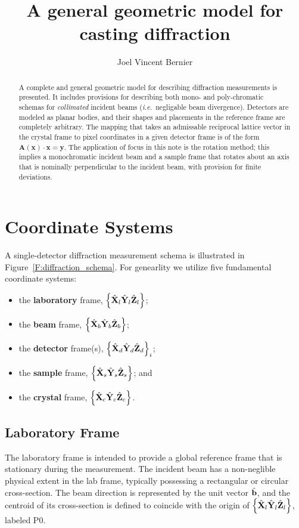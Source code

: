 \documentclass[12pt,letterpaper,final]{amsart}
\author{Joel Vincent Bernier}
\title{A general geometric model for casting diffraction}
\newcommand{\mbm}[1]{\ensuremath{\mbox{\boldmath$#1$}}}
\newcommand{\bhat}{\ensuremath{\hat{\mbm{\mathrm{b}}}}}
\newcommand{\Pzero}{\ensuremath{\mathrm{P0}}}
\newcommand{\Xl}{\ensuremath{\hat{\mbm{\mathrm{X}}}_l}}
\newcommand{\Yl}{\ensuremath{\hat{\mbm{\mathrm{Y}}}_l}}
\newcommand{\Zl}{\ensuremath{\hat{\mbm{\mathrm{Z}}}_l}}
\newcommand{\labframe}{\ensuremath{\left\{\Xl\Yl\Zl\right\}}}
\newcommand{\Xb}{\ensuremath{\hat{\mbm{\mathrm{X}}}_b}}
\newcommand{\Yb}{\ensuremath{\hat{\mbm{\mathrm{Y}}}_b}}
\newcommand{\Zb}{\ensuremath{\hat{\mbm{\mathrm{Z}}}_b}}
\newcommand{\beamframe}{\ensuremath{\left\{\Xb\Yb\Zb\right\}}}
\newcommand{\Xd}{\ensuremath{\hat{\mbm{\mathrm{X}}}_d}}
\newcommand{\Yd}{\ensuremath{\hat{\mbm{\mathrm{Y}}}_d}}
\newcommand{\Zd}{\ensuremath{\hat{\mbm{\mathrm{Z}}}_d}}
\newcommand{\detframe}{\ensuremath{\left\{\Xd\Yd\Zd\right\}}}
\newcommand{\Xs}{\ensuremath{\hat{\mbm{\mathrm{X}}}_s}}
\newcommand{\Ys}{\ensuremath{\hat{\mbm{\mathrm{Y}}}_s}}
\newcommand{\Zs}{\ensuremath{\hat{\mbm{\mathrm{Z}}}_s}}
\newcommand{\samframe}{\ensuremath{\left\{\Xs\Ys\Zs\right\}}}
\newcommand{\Xc}{\ensuremath{\hat{\mbm{\mathrm{X}}}_c}}
\newcommand{\Yc}{\ensuremath{\hat{\mbm{\mathrm{Y}}}_c}}
\newcommand{\Zc}{\ensuremath{\hat{\mbm{\mathrm{Z}}}_c}}
\newcommand{\xtlframe}{\ensuremath{\left\{\Xc\Yc\Zc\right\}}}
\newcommand{\figref}[1]{Figure~\ref{#1}}
\newcommand{\ie}{{\em i.e.}}
\begin{document}
\maketitle
\begin{abstract}
A complete and general geometric model for describing diffraction
measurements is presented.  It includes provisions for describing both
mono- and poly-chromatic schemas for {\em collimated} incident beams
(\ie\ negligable beam divergence).  Detectors are modeled as planar
bodies, and their shapes and placements in the reference frame are
completely arbitrary.  The mapping that takes an admissable reciprocal
lattice vector in the crystal frame to pixel coordinates in a given
detector frame is of the form $\mathbf{A}(\mathbf{x})\cdot\mathbf{x} =
\mathbf{y}$.  The application of focus in this note is the rotation
method; this implies a monochromatic incident beam and a sample frame
that rotates about an axis that is nominally perpendicular to the
incident beam, with provision for finite deviations.
\end{abstract}

\section{Coordinate Systems}

A single-detector diffraction measurement schema is illustrated in
\figref{F:diffraction_schema}.  For genearlity we utilize five
fundamental coordinate systems:
\begin{itemize}
  \item the {\bf laboratory} frame, \labframe;
  \item the {\bf beam} frame, \beamframe;
  \item the {\bf detector} frame(s), $\detframe_i$;
  \item the {\bf sample} frame, \samframe; and
  \item the {\bf crystal} frame, \xtlframe.
\end{itemize}
\newpage
\subsection{Laboratory Frame}\label{S:laboratory}
The laboratory frame is intended to provide a global reference frame
that is stationary during the measurement.  The incident beam has a
non-neglible physical extent in the lab frame, typically possessing a
rectangular or circular cross-section.  The beam direction is
represented by the unit vector \bhat, and the centroid of its
cross-section is defined to coincide with the origin of \labframe,
labeled \Pzero.
\end{document}
